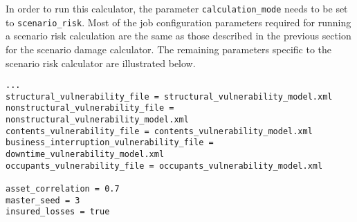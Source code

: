 In order to run this calculator, the parameter \Verb+calculation_mode+ needs
to be set to \Verb+scenario_risk+. Most of the job configuration parameters 
required for running a scenario risk calculation are the same as those 
described in the previous section for the scenario damage calculator.
The remaining parameters specific to the scenario risk calculator 
are illustrated below.

\begin{Verbatim}[frame=single, commandchars=\\\{\}, samepage=true]
...
structural_vulnerability_file = structural_vulnerability_model.xml
nonstructural_vulnerability_file = nonstructural_vulnerability_model.xml
contents_vulnerability_file = contents_vulnerability_model.xml
business_interruption_vulnerability_file = downtime_vulnerability_model.xml
occupants_vulnerability_file = occupants_vulnerability_model.xml

asset_correlation = 0.7
master_seed = 3
insured_losses = true
\end{Verbatim}

